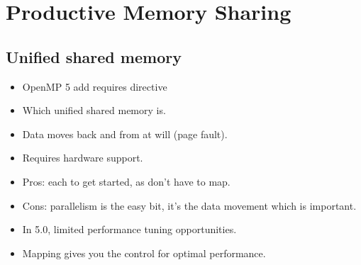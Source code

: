
\def\ArtDir{07.USM/figures}

\chapter{Productive Memory Sharing}
\label{chapter:USM}

\section{Unified shared memory}
\label{sec:usm}
\begin{itemize}
  \item OpenMP 5 add requires directive
  \item Which unified shared memory is.
  \item Data moves back and from at will (page fault).
  \item Requires hardware support.
  \item Pros: each to get started, as don't have to map.
  \item Cons: parallelism is the easy bit, it's the data movement which is important.
  \item In 5.0, limited performance tuning opportunities.
  \item Mapping gives you the control for optimal performance.
\end{itemize}

